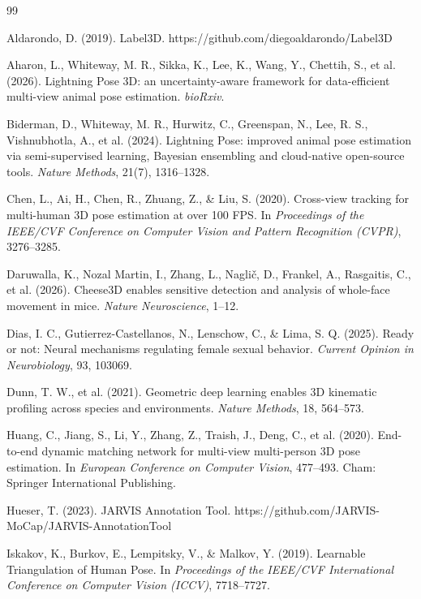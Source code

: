 \documentclass[pdflatex, sn-nature]{sn-jnl}
\theoremstyle{thmstyleone}%
\theoremstyle{thmstyletwo}%
\theoremstyle{thmstylethree}%
\begin{document}
\begin{thebibliography}{99}

 Aldarondo, D. (2019). Label3D. https://github.com/diegoaldarondo/Label3D

 Aharon, L., Whiteway, M. R., Sikka, K., Lee, K., Wang, Y., Chettih, S., et al. (2026). Lightning Pose 3D: an uncertainty-aware framework for data-efficient multi-view animal pose estimation. \textit{bioRxiv}.

 Biderman, D., Whiteway, M. R., Hurwitz, C., Greenspan, N., Lee, R. S., Vishnubhotla, A., et al. (2024). Lightning Pose: improved animal pose estimation via semi-supervised learning, Bayesian ensembling and cloud-native open-source tools. \textit{Nature Methods}, 21(7), 1316--1328.

 Chen, L., Ai, H., Chen, R., Zhuang, Z., \& Liu, S. (2020). Cross-view tracking for multi-human 3D pose estimation at over 100 FPS. In \textit{Proceedings of the IEEE/CVF Conference on Computer Vision and Pattern Recognition (CVPR)}, 3276--3285.

 Daruwalla, K., Nozal Martin, I., Zhang, L., Naglič, D., Frankel, A., Rasgaitis, C., et al. (2026). Cheese3D enables sensitive detection and analysis of whole-face movement in mice. \textit{Nature Neuroscience}, 1--12.

 Dias, I. C., Gutierrez-Castellanos, N., Lenschow, C., \& Lima, S. Q. (2025). Ready or not: Neural mechanisms regulating female sexual behavior. \textit{Current Opinion in Neurobiology}, 93, 103069.

 Dunn, T. W., et al. (2021). Geometric deep learning enables 3D kinematic profiling across species and environments. \textit{Nature Methods}, 18, 564--573.

 Huang, C., Jiang, S., Li, Y., Zhang, Z., Traish, J., Deng, C., et al. (2020). End-to-end dynamic matching network for multi-view multi-person 3D pose estimation. In \textit{European Conference on Computer Vision}, 477--493. Cham: Springer International Publishing.

 Hueser, T. (2023). JARVIS Annotation Tool. https://github.com/JARVIS-MoCap/JARVIS-AnnotationTool

 Iskakov, K., Burkov, E., Lempitsky, V., \& Malkov, Y. (2019). Learnable Triangulation of Human Pose. In \textit{Proceedings of the IEEE/CVF International Conference on Computer Vision (ICCV)}, 7718--7727.


\end{thebibliography}
\end{document}
